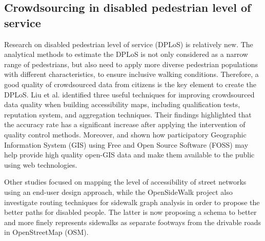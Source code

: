 \documentclass[10pt,conference,a4paper]{IEEEtran}
\begin{document}
\subsection{Crowdsourcing in disabled pedestrian level of service}
Research on disabled pedestrian level of service (DPLoS) is relatively new. The analytical methods to estimate the DPLoS is not only considered as a narrow range of pedestrians, but also need to apply more diverse pedestrian populations with different characteristics, to ensure inclusive walking conditions. Therefore, a good quality of crowdsourced data from citizens is the key element to create the DPLoS. Liu et al. \cite{liu2018} identified three useful techniques for improving crowdsourced data quality when building accessibility maps, including qualification tests, reputation system, and aggregation techniques. Their findings highlighted that the accuracy rate has a significant increase after applying the intervention of quality control methods. Moreover, \cite{brovelli_webbased_2014} and \cite{minghini_multi-dimensional_2014} shown how participatory Geographic Information System (GIS) using Free and Open Source Software (FOSS) may help provide high quality open-GIS data and make them available to the public using web technologies. 

Other studies \cite{comai_mapping_2015, gharebaghi2017confidence} focused on mapping the level of accessibility of street networks %
using an end-user design approach, while
the OpenSideWalk project also
\cite{noauthor_opensidewalks_nodate} 
investigate routing techniques for sidewalk graph analysis in order to propose the better paths for disabled people. The latter is now proposing a schema to better and more finely represents sidewalks as separate footways from the drivable roads in OpenStreetMap (OSM).%


\end{document}
